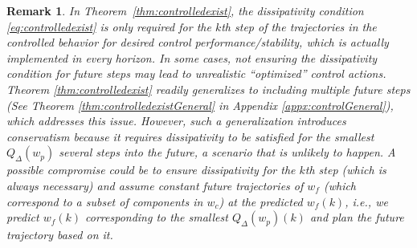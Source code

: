 \documentclass[11pt,print,draftcls,onecolumn,romanappendices]{ieeecolor}
\newtheorem{rem}{Remark}
\newcommand{\revise}[1]{{\color{black} #1}}
\begin{document}
\revise{\begin{rem} In Theorem~\ref{thm:controlledexist}, the  dissipativity condition \eqref{eq:controlledexist} is only required for the $k$th step of the trajectories in the controlled behavior for desired control performance/stability, which is actually implemented in every horizon.  In some cases, not ensuring the dissipativity condition for future steps may lead to unrealistic ``optimized'' control actions. Theorem \ref{thm:controlledexist} readily generalizes to including multiple future steps (See Theorem \ref{thm:controlledexistGeneral} in Appendix \ref{appx:controlGeneral}), which addresses this issue. However, such a generalization introduces conservatism because it requires dissipativity to be satisfied for the smallest $Q_\Delta(w_p)$ several steps into the future, a scenario that is unlikely to happen. A possible compromise could be to ensure dissipativity for the $k$th step (which is always necessary) and assume constant future trajectories of $w_f$ (which correspond to a subset of components in $w_c$) at the predicted $w_f(k)$, i.e., we predict $w_f(k)$ corresponding to the smallest $Q_\Delta(w_p)(k)$ and plan the future trajectory based on it. 
\end{rem}}
\end{document}
